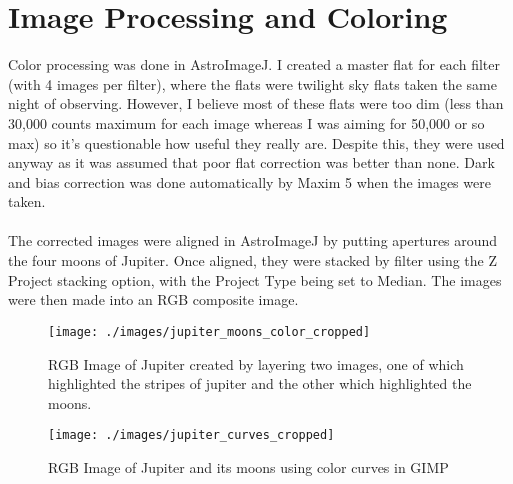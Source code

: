 \documentclass[12pt]{article}
\begin{document}
	\section{Image Processing and Coloring}
	Color processing was done in AstroImageJ. I created a master flat for each filter (with 4 images per filter), where the flats were twilight sky flats taken the same night of observing. However, I believe most of these flats were too dim (less than 30,000 counts maximum for each image whereas I was aiming for 50,000 or so max) so it's questionable how useful they really are. Despite this, they were used anyway as it was assumed that poor flat correction was better than none. Dark and bias correction was done automatically by Maxim 5 when the images were taken.
	\\\\
	The corrected images were aligned in AstroImageJ by putting apertures around the four moons of Jupiter. Once aligned, they were stacked by filter using the Z Project stacking option, with the Project Type being set to Median. The images were then made into an RGB composite image.
	
		\begin{figure}
			\texttt{[image: ./images/jupiter\_moons\_color\_cropped]}
			\caption{RGB Image of Jupiter created by layering two images, one of which highlighted the stripes of jupiter and the other which highlighted the moons.}
		\end{figure}
	
		\begin{figure}
			\texttt{[image: ./images/jupiter\_curves\_cropped]}
			\caption{RGB Image of Jupiter and its moons using color curves in GIMP}
		\end{figure}
	
\end{document}
